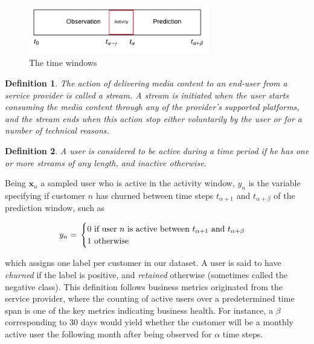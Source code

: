 \documentclass{kththesis}
\newtheorem{definition}{Definition}
\begin{document}
\begin{figure}[h]
    \centering
    \includegraphics[width=0.7\textwidth,keepaspectratio]{figures/timewindows.pdf}
    \caption{The time windows}
    \label{fig:timewindows}
\end{figure}

\begin{definition}
The action of delivering media content to an end-user from a service provider is called a \emph{stream}. A stream is initiated when the user starts consuming the media content through any of the provider's supported platforms, and the stream ends when this action stop either voluntarily by the user or for a number of technical reasons.
\end{definition}

\begin{definition}
A user is considered to be \emph{active} during a time period if he has one or more streams of any length, and \emph{inactive} otherwise.
\end{definition}

Being $\mathbf{x}_n$ a sampled user who is active in the activity window, $y_{n}$ is the variable specifying if customer $n$ has churned between time steps $t_{\alpha+1}$ and $t_{\alpha+\beta}$ of the prediction window, such as

\begin{equation}
y_n = \\ 
\begin{cases}
  \text{0 if user $n$ is active between $t_{\alpha+1}$ and $t_{\alpha+\beta}$} \\    
  \text{1 otherwise}    
\end{cases}
\end{equation}

which assigns one label per customer in our dataset. A user is said to have \emph{churned} if the label is positive, and \emph{retained} otherwise (sometimes called the negative class). This definition follows business metrics originated from the service provider, where the counting of active users over a predetermined time span is one of the key metrics indicating business health. For instance, a $\beta$ corresponding to 30 days would yield whether the customer will be a monthly active user the following month after being observed for $\alpha$ time steps. 
\end{document}
